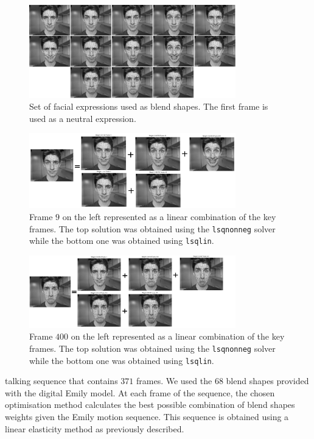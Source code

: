 \documentclass[11pt]{report}
\begin{document}
\begin{figure}[htbp!]
\centering
\includegraphics[width=0.8\textwidth]{img/weights/2D/basis/all.png}
	\caption{Set of facial expressions used as blend shapes. The first frame is used as a neutral expression.}
	\label{fig:2Dblends}
\end{figure}
\begin{figure}[htbp!]
\centering
\includegraphics[width=0.8\textwidth]{img/weights/2D/frame_10/all.png}
	\caption{Frame $9$ on the left represented as a linear combination of the key frames. The top solution was obtained using the \texttt{lsqnonneg} solver while the bottom one was obtained using \texttt{lsqlin}.}
	\label{fig:frame10}
\end{figure}

\begin{figure}[htbp!]
\centering
\includegraphics[width=0.8\textwidth]{img/weights/2D/frame_400/all.png}
	\caption{Frame $400$ on the left represented as a linear combination of the key frames. The top solution was obtained using the \texttt{lsqnonneg} solver while the bottom one was obtained using \texttt{lsqlin}.}
	\label{fig:frame400}
\end{figure}

talking sequence that contains $371$ frames. We used the $68$ blend shapes provided with the digital Emily model.  At each frame of the sequence, the chosen optimisation method calculates the best possible combination of blend shapes weights given the Emily motion sequence. This sequence is obtained using a linear elasticity method as previously described. 
\end{document}
